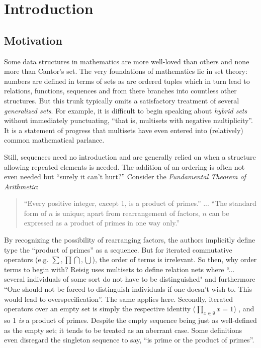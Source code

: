 \chapter{Introduction}
\doublespacing


\section{Motivation}



Some data structures in mathematics are more well-loved than others and none more than Cantor's set.
The very foundations of mathematics lie in set theory: numbers are defined in terms of sets as are ordered tuples which in turn lead to relations, functions, sequences and from there branches into countless other structures.
But this trunk typically omits a satisfactory treatment of several \emph{generalized sets}.
For example, it is difficult to begin speaking about \emph{hybrid sets} without immediately punctuating, ``that is, multisets with negative multiplicity''.
It is a statement of progress that multisets have even entered into (relatively) common mathematical parlance.



Still, sequences need no introduction and are generally relied on when a structure allowing repeated elements is needed.
The addition of an ordering is often not even needed but ``surely it can't hurt?''
Consider the \emph{Fundamental Theorem of Arithmetic}:
\begin{quote}
``Every positive integer, except 1, is a product of primes.'' ... ``The standard form of $n$ is unique; apart from rearrangement of factors, $n$ can be expressed as a product of primes in one way only.''
\end{quote}
By recognizing the possibility of rearranging factors, the authors implicitly define type the ``product of primes'' as a sequence.
But for iterated commutative operators (e.g. $\sum, \prod \bigcap, \bigcup$), the order of terms is irrelevant.
So then, why order terms to begin with?
Reisig \cite{reisig1985petri} uses multisets to define relation nets where ``... several individuals of some sort do not have
to be distinguished" and furthermore ``One should not be forced to distinguish individuals if one doesn't wish to. This would lead to overspecification''.
The same applies here.
Secondly, iterated operators over an empty set is simply the respective identity ($\prod_{x\in \emptyset} x = 1$) , and so 1 \emph{is} a product of primes.
Despite the empty sequence being just as well-defined as the empty set; it tends to be treated as an aberrant case.
Some definitions even disregard the singleton sequence to say, ``is prime or the product of primes''. 



